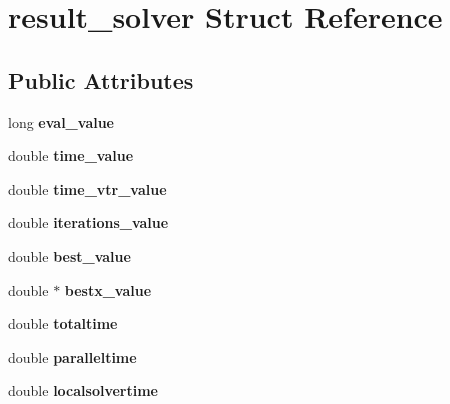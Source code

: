 \hypertarget{structresult__solver}{\section{result\-\_\-solver Struct Reference}
\label{structresult__solver}
}
\subsection*{Public Attributes}
\begin{DoxyCompactItemize}
\item 
\hypertarget{structresult__solver_afb3e321d12f0b6ecefdeab9ec7844930}{long {\bfseries eval\-\_\-value}}\label{structresult__solver_afb3e321d12f0b6ecefdeab9ec7844930}

\item 
\hypertarget{structresult__solver_aa2231ca2b716ff715f545acd3f2bca93}{double {\bfseries time\-\_\-value}}\label{structresult__solver_aa2231ca2b716ff715f545acd3f2bca93}

\item 
\hypertarget{structresult__solver_a657bf73170472bbbf4395653e534e230}{double {\bfseries time\-\_\-vtr\-\_\-value}}\label{structresult__solver_a657bf73170472bbbf4395653e534e230}

\item 
\hypertarget{structresult__solver_ae0fabec7785c592f71d7e783f93f4015}{double {\bfseries iterations\-\_\-value}}\label{structresult__solver_ae0fabec7785c592f71d7e783f93f4015}

\item 
\hypertarget{structresult__solver_ad9e51132be299a3d93e3bdf57087d02b}{double {\bfseries best\-\_\-value}}\label{structresult__solver_ad9e51132be299a3d93e3bdf57087d02b}

\item 
\hypertarget{structresult__solver_aa33e6f9b81abf63dbe9d0981a5e313da}{double $\ast$ {\bfseries bestx\-\_\-value}}\label{structresult__solver_aa33e6f9b81abf63dbe9d0981a5e313da}

\item 
\hypertarget{structresult__solver_aaceb49f43c847eb58a59032ca117b254}{double {\bfseries totaltime}}\label{structresult__solver_aaceb49f43c847eb58a59032ca117b254}

\item 
\hypertarget{structresult__solver_ae181bb4eaf14c102928651f625dc3325}{double {\bfseries paralleltime}}\label{structresult__solver_ae181bb4eaf14c102928651f625dc3325}

\item 
\hypertarget{structresult__solver_a53ebaae38b00103d598c684a8b42d0b1}{double {\bfseries localsolvertime}}\label{structresult__solver_a53ebaae38b00103d598c684a8b42d0b1}

\end{DoxyCompactItemize}


